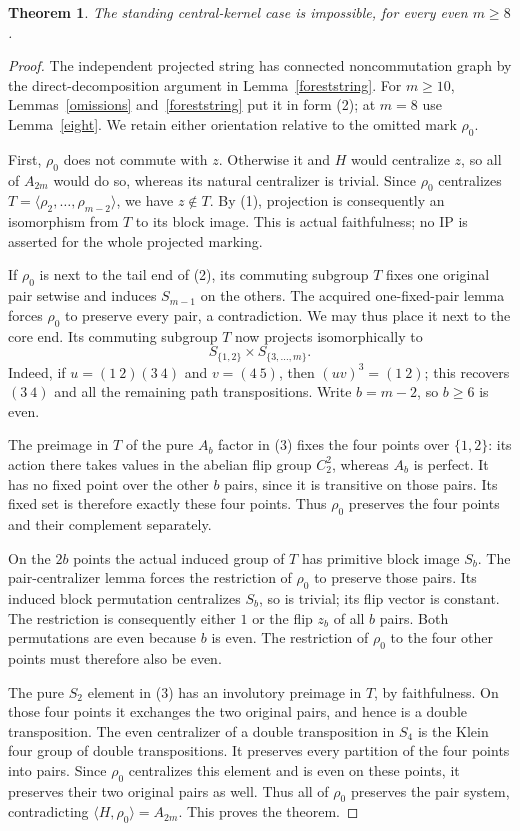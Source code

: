 \documentclass[11pt,a4paper]{article}
\newtheorem{theorem}[lemma]{Theorem}
\newcommand{\gen}[1]{\langle#1\rangle}
\begin{document}
\begin{theorem}\label{main}
The standing central-kernel case is impossible, for every
even $m\ge8$.
\end{theorem}
\begin{proof}
The independent projected string has connected noncommutation
graph by the direct-decomposition argument in
Lemma~\ref{foreststring}. For $m\ge10$, Lemmas~\ref{omissions}
and~\ref{foreststring} put it in form (2); at $m=8$ use
Lemma~\ref{eight}. We retain either orientation relative to
the omitted mark $\rho_0$.

First, $\rho_0$ does not commute with $z$. Otherwise it and
$H$ would centralize $z$, so all of $A_{2m}$ would do so,
whereas its natural centralizer is trivial. Since $\rho_0$
centralizes $T=\gen{\rho_2,\ldots,\rho_{m-2}}$, we have
$z\notin T$. By (1), projection is consequently an isomorphism
from $T$ to its block image. This is actual faithfulness;
no IP is asserted for the whole projected marking.

If $\rho_0$ is next to the tail end of (2), its commuting
subgroup $T$ fixes one original pair setwise and induces
$S_{m-1}$ on the others. The acquired one-fixed-pair lemma
forces $\rho_0$ to preserve every pair, a contradiction.
We may thus place it next to the core end. Its commuting
subgroup $T$ now projects isomorphically to
\[
                 S_{\{1,2\}}\times S_{\{3,\ldots,m\}}.
                                                               \tag{3}
\]
Indeed, if $u=(1\ 2)(3\ 4)$ and $v=(4\ 5)$, then
$(uv)^3=(1\ 2)$; this recovers $(3\ 4)$ and all the
remaining path transpositions. Write $b=m-2$, so $b\ge6$
is even.

The preimage in $T$ of the pure $A_b$ factor in (3) fixes
the four points over $\{1,2\}$: its action there takes
values in the abelian flip group $C_2^2$, whereas $A_b$
is perfect. It has no fixed point over the other $b$
pairs, since it is transitive on those pairs. Its fixed
set is therefore exactly these four points. Thus
$\rho_0$ preserves the four points and their complement
separately.

On the $2b$ points the actual induced group of $T$ has
primitive block image $S_b$. The pair-centralizer lemma
forces the restriction of $\rho_0$ to preserve those
pairs. Its induced block permutation centralizes $S_b$,
so is trivial; its flip vector is constant. The restriction
is consequently either $1$ or the flip $z_b$ of all $b$
pairs. Both permutations are even because $b$ is even.
The restriction of $\rho_0$ to the four other points
must therefore also be even.

The pure $S_2$ element in (3) has an involutory preimage
in $T$, by faithfulness. On those four points it exchanges
the two original pairs, and hence is a double transposition.
The even centralizer of a double transposition in $S_4$
is the Klein four group of double transpositions. It
preserves every partition of the four points into pairs.
Since $\rho_0$ centralizes this element and is even on
these points, it preserves their two original pairs as
well. Thus all of $\rho_0$ preserves the pair system,
contradicting $\gen{H,\rho_0}=A_{2m}$. This proves the
theorem.
\end{proof}
\end{document}
